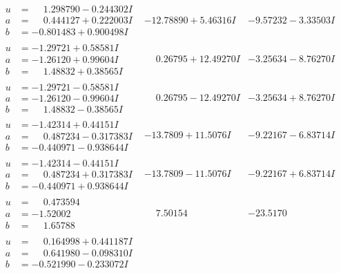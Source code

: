\documentclass[1p]{elsarticle_modified}
\theoremstyle{definition}
\begin{document}
$$\begin{array}{c|c|c}
\begin{aligned}
u &= \phantom{-}1.298790 - 0.244302 I \\
a &= \phantom{-}0.444127 + 0.222003 I \\
b &= -0.801483 + 0.900498 I\end{aligned}
 & -12.78890 + 5.46316 I & -9.57232 - 3.33503 I \\ \hline\begin{aligned}
u &= -1.29721 + 0.58581 I \\
a &= -1.26120 + 0.99604 I \\
b &= \phantom{-}1.48832 + 0.38565 I\end{aligned}
 & \phantom{-}0.26795 + 12.49270 I & -3.25634 - 8.76270 I \\ \hline\begin{aligned}
u &= -1.29721 - 0.58581 I \\
a &= -1.26120 - 0.99604 I \\
b &= \phantom{-}1.48832 - 0.38565 I\end{aligned}
 & \phantom{-}0.26795 - 12.49270 I & -3.25634 + 8.76270 I \\ \hline\begin{aligned}
u &= -1.42314 + 0.44151 I \\
a &= \phantom{-}0.487234 - 0.317383 I \\
b &= -0.440971 - 0.938644 I\end{aligned}
 & -13.7809 + 11.5076 I & -9.22167 - 6.83714 I \\ \hline\begin{aligned}
u &= -1.42314 - 0.44151 I \\
a &= \phantom{-}0.487234 + 0.317383 I \\
b &= -0.440971 + 0.938644 I\end{aligned}
 & -13.7809 - 11.5076 I & -9.22167 + 6.83714 I \\ \hline\begin{aligned}
u &= \phantom{-}0.473594\phantom{ +0.000000I} \\
a &= -1.52002\phantom{ +0.000000I} \\
b &= \phantom{-}1.65788\phantom{ +0.000000I}\end{aligned}
 & \phantom{-}7.50154\phantom{ +0.000000I} & -23.5170\phantom{ +0.000000I} \\ \hline\begin{aligned}
u &= \phantom{-}0.164998 + 0.441187 I \\
a &= \phantom{-}0.641980 - 0.098310 I \\
b &= -0.521990 - 0.233072 I\end{aligned}

\end{array}$$
\end{document}
